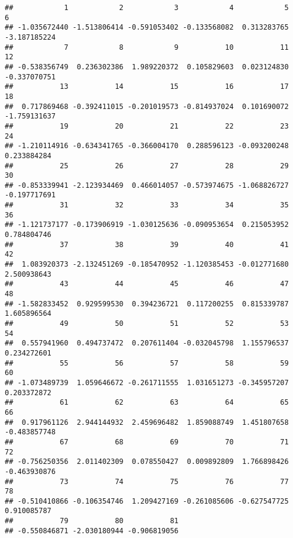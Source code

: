\documentclass[
]{article}
\newenvironment{Shaded}{\begin{snugshade}}{\end{snugshade}}
\newcommand{\FunctionTok}[1]{\textcolor[rgb]{0.00,0.00,0.00}{#1}}
\newcommand{\NormalTok}[1]{#1}
\newcommand{\SpecialCharTok}[1]{\textcolor[rgb]{0.00,0.00,0.00}{#1}}
\begin{document}
\begin{verbatim}
##            1            2            3            4            5            6 
## -1.035672440 -1.513806414 -0.591053402 -0.133568082  0.313283765 -3.187185224 
##            7            8            9           10           11           12 
## -0.538356749  0.236302386  1.989220372  0.105829603  0.023124830 -0.337070751 
##           13           14           15           16           17           18 
##  0.717869468 -0.392411015 -0.201019573 -0.814937024  0.101690072 -1.759131637 
##           19           20           21           22           23           24 
## -1.210114916 -0.634341765 -0.366004170  0.288596123 -0.093200248  0.233884284 
##           25           26           27           28           29           30 
## -0.853339941 -2.123934469  0.466014057 -0.573974675 -1.068826727 -0.197717691 
##           31           32           33           34           35           36 
## -1.121737177 -0.173906919 -1.030125636 -0.090953654  0.215053952  0.784804746 
##           37           38           39           40           41           42 
##  1.083920373 -2.132451269 -0.185470952 -1.120385453 -0.012771680  2.500938643 
##           43           44           45           46           47           48 
## -1.582833452  0.929599530  0.394236721  0.117200255  0.815339787  1.605896564 
##           49           50           51           52           53           54 
##  0.557941960  0.494737472  0.207611404 -0.032045798  1.155796537  0.234272601 
##           55           56           57           58           59           60 
## -1.073489739  1.059646672 -0.261711555  1.031651273 -0.345957207  0.203372872 
##           61           62           63           64           65           66 
##  0.917961126  2.944144932  2.459696482  1.859088749  1.451807658 -0.483857748 
##           67           68           69           70           71           72 
## -0.756250356  2.011402309  0.078550427  0.009892809  1.766898426 -0.463930876 
##           73           74           75           76           77           78 
## -0.510410866 -0.106354746  1.209427169 -0.261085606 -0.627547725  0.910085787 
##           79           80           81 
## -0.550846871 -2.030180944 -0.906819056
\end{verbatim}

\begin{Shaded}
\end{Shaded}
\end{document}
